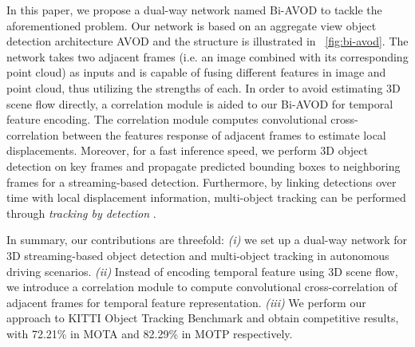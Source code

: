 \documentclass{bmvc2k}
\begin{document}

In this paper, we propose a dual-way network named Bi-AVOD to tackle the aforementioned problem. Our network is based on an aggregate view object detection architecture AVOD \cite{ku2018joint} and the structure is illustrated in \figurename \, \ref{fig:bi-avod}. The network takes two adjacent frames (i.e. an image combined with its corresponding point cloud) as inputs and is capable of fusing different features in image and point cloud, thus utilizing the strengths of each. In order to avoid estimating 3D scene flow directly, a correlation module is aided to our Bi-AVOD for temporal feature encoding. The correlation module computes convolutional cross-correlation between the features response of adjacent frames to estimate local displacements. Moreover, for a fast inference speed, we perform 3D object detection on key frames and propagate predicted bounding boxes to neighboring frames for a streaming-based detection. Furthermore, by linking detections over time with local displacement information, multi-object tracking can be performed through \textit{tracking by detection} \cite{lenz2015followme}. 


In summary, our contributions are threefold: 
\textit{(i)} we set up a dual-way network for 3D streaming-based object detection and multi-object tracking in autonomous driving scenarios. \textit{(ii)} Instead of encoding temporal feature using 3D scene flow, we introduce a correlation module to compute convolutional cross-correlation of adjacent frames for temporal feature representation. \textit{(iii)} We perform our approach to KITTI Object Tracking Benchmark and obtain competitive results, with 72.21\% in MOTA and 82.29\% in MOTP respectively.
\end{document}
